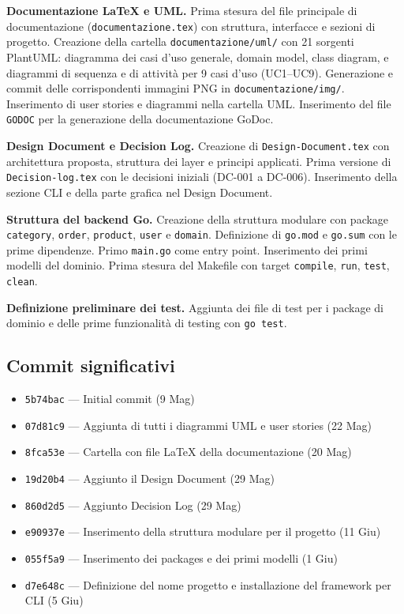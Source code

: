 \documentclass[a4paper,12pt]{article}
\begin{document}
\textbf{Documentazione LaTeX e UML.}
Prima stesura del file principale di documentazione (\texttt{documentazione.tex}) con struttura, interfacce e sezioni di progetto. Creazione della cartella \texttt{documentazione/uml/} con 21 sorgenti PlantUML: diagramma dei casi d'uso generale, domain model, class diagram, e diagrammi di sequenza e di attivit\`{a} per 9 casi d'uso (UC1--UC9). Generazione e commit delle corrispondenti immagini PNG in \texttt{documentazione/img/}. Inserimento di user stories e diagrammi nella cartella UML. Inserimento del file \texttt{GODOC} per la generazione della documentazione GoDoc.

\textbf{Design Document e Decision Log.}
Creazione di \texttt{Design-Document.tex} con architettura proposta, struttura dei layer e principi applicati. Prima versione di \texttt{Decision-log.tex} con le decisioni iniziali (DC-001 a DC-006). Inserimento della sezione CLI e della parte grafica nel Design Document.

\textbf{Struttura del backend Go.}
Creazione della struttura modulare con package \texttt{category}, \texttt{order}, \texttt{product}, \texttt{user} e \texttt{domain}. Definizione di \texttt{go.mod} e \texttt{go.sum} con le prime dipendenze. Primo \texttt{main.go} come entry point. Inserimento dei primi modelli del dominio. Prima stesura del Makefile con target \texttt{compile}, \texttt{run}, \texttt{test}, \texttt{clean}.

\textbf{Definizione preliminare dei test.}
Aggiunta dei file di test per i package di dominio e delle prime funzionalit\`{a} di testing con \texttt{go test}.

\subsection*{Commit significativi}
\begin{itemize}
    \item \texttt{5b74bac} --- Initial commit (9 Mag)
    \item \texttt{07d81c9} --- Aggiunta di tutti i diagrammi UML e user stories (22 Mag)
    \item \texttt{8fca53e} --- Cartella con file LaTeX della documentazione (20 Mag)
    \item \texttt{19d20b4} --- Aggiunto il Design Document (29 Mag)
    \item \texttt{860d2d5} --- Aggiunto Decision Log (29 Mag)
    \item \texttt{e90937e} --- Inserimento della struttura modulare per il progetto (11 Giu)
    \item \texttt{055f5a9} --- Inserimento dei packages e dei primi modelli (1 Giu)
    \item \texttt{d7e648c} --- Definizione del nome progetto e installazione del framework per CLI (5 Giu)
\end{itemize}
\end{document}
